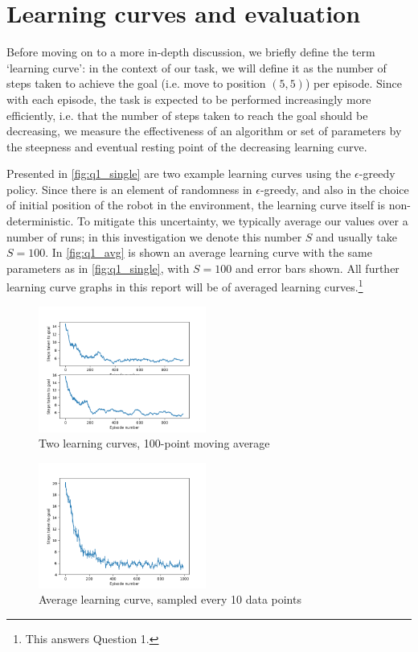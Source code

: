 \documentclass[a4paper, 11pt, twocolumn, final]{article} %
\begin{document}
\section{Learning curves and evaluation} Before moving on to a more in-depth
discussion, we briefly define the term `learning curve': in the context of our
task, we will define it as the number of steps taken to achieve the goal (i.e.
move to position $(5, 5)$) per episode.  Since with each episode, the task is
expected to be performed increasingly more efficiently, i.e. that the number of
steps taken to reach the goal should be decreasing, we measure the effectiveness
of an algorithm or set of parameters by the steepness and eventual resting point
of the decreasing learning curve.

Presented in \autoref{fig:q1_single} are two example learning curves using the
$\epsilon$-greedy policy.  Since there is an element of randomness in
$\epsilon$-greedy, and also in the choice of initial position of the robot in
the environment, the learning curve itself is non-deterministic.  To mitigate
this uncertainty, we typically average our values over a number of runs; in this
investigation we denote this number $S$ and usually take $S = 100$.  In
\autoref{fig:q1_avg} is shown an average learning curve with the same parameters
as in \autoref{fig:q1_single}, with $S = 100$ and error bars shown.  All further
learning curve graphs in this report will be of averaged learning
curves.\footnote{This answers Question 1.}

\begin{figure}
  \includegraphics[width=0.49\textwidth]{figures/q1_figure_single.png}
  \caption{Two learning curves, 100-point moving average}
  \label{fig:q1_single}
\end{figure}

\begin{figure}
  \includegraphics[width=0.49\textwidth]{figures/q1_figure_avg.png}
  \caption{Average learning curve, sampled every 10 data points}
  \label{fig:q1_avg}
\end{figure}
\end{document}
